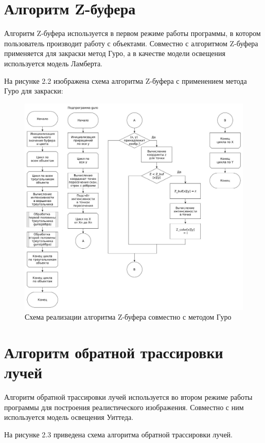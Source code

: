 \section{Алгоритм Z-буфера}
Алгоритм Z-буфера используется в первом режиме работы программы, в котором пользователь производит работу с объектами.
Совместно с алгоритмом Z-буфера применяется для закраски метод Гуро, а в качестве модели освещения используется
модель Ламберта.

На рисунке 2.2 изображена схема алгоритма Z-буфера с применением метода Гуро для закраски:
\FloatBarrier
\begin{figure}[h]
	\begin{center}
		\includegraphics[width=\linewidth]{graph/zbuf.jpg}
	\end{center}
	\caption{Схема реализации алгоритма Z-буфера совместно с методом Гуро}
\end{figure}
\FloatBarrier

\section{Алгоритм обратной трассировки лучей}
Алгоритм обратной трассировки лучей используется во втором режиме работы программы для построения реалистического изображения.
Совместно с ним используется модель освещения Уиттеда.

На рисунке 2.3 приведена схема алгоритма обратной трассировки лучей.

